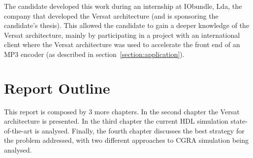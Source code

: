 The candidate developed this work during an internship at IObundle, Lda, the company that
developed the Versat architecture (and is sponsoring the candidate's thesis). This allowed the candidate
to gain a deeper knowledge of the Versat architecture, mainly by participating
in a project with an international client where the Versat architecture was used
to accelerate the front end of an MP3 encoder (as described in section~\ref{section:application}).

\section{Report Outline}
\label{section:outline}

This report is composed by 3 more chapters. In the second chapter the Versat
architecture is presented. In the third chapter the current HDL simulation
state-of-the-art is analysed. Finally, the fourth chapter discusses the best
strategy for the problem addressed, with two different approaches to CGRA
simulation being analysed.

